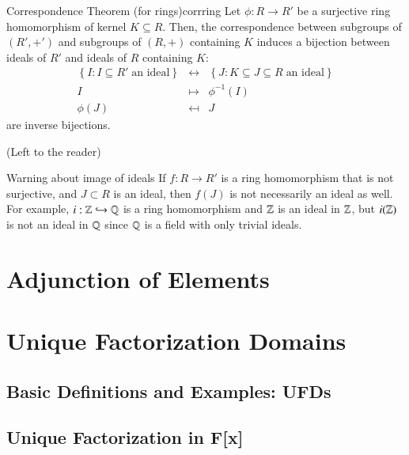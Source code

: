\documentclass[12pt, a4paper, twoside, openright, titlepage]{book}
\begin{document}
\begin{namthm}{Correspondence Theorem (for rings)}{corrring}
    Let $\phi:R \rightarrow R'$ be a surjective ring homomorphism of kernel $K \subseteq R$. Then, the correspondence between subgroups of $(R',+')$ and subgroups of $(R,+)$ containing $K$ induces a bijection between ideals of $R'$ and ideals of $R$ containing $K$: 
    \begin{equation}
        \begin{array}{rcl}
            \left\{I:I\subseteq R'\;\text{an ideal}\right\} &\leftrightarrow& \left\{J:K \subseteq J \subseteq R\;\text{an ideal}\right\} \\
            I &\mapsto& \phi^{-1}(I) \\
            \phi(J) &\mapsfrom& J
        \end{array}
    \end{equation}
    are inverse bijections.
\end{namthm}
\begin{proof*}{}{}
    (Left to the reader)
\end{proof*}

\begin{rmk}{Warning about image of ideals}{}
        If $f:R\rightarrow R'$ is a ring homomorphism that is not surjective, and $J \subset R$ is an ideal, then $f(J)$ is not necessarily an ideal as well. For example, $i:\mathbb Z\hookrightarrow \mathbb Q$ is a ring homomorphism and $\mathbb Z$ is an ideal in $\mathbb Z$, but $i(\mathbb Z)$ is not an ideal in $\mathbb Q$ since $\mathbb Q$ is a field with only trivial ideals.
\end{rmk}


\chapter{\textsection\textsection Adjunction of Elements}




\chapter{\textsection\textsection Unique Factorization Domains}

\section{\textsection Basic Definitions and Examples: UFDs}


\section{\textsection Unique Factorization in F[x]}
\end{document}
